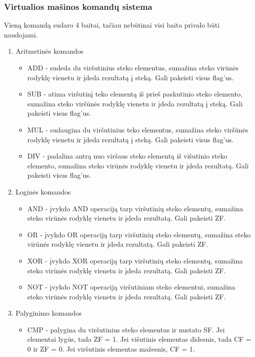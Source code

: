 	\subsubsection{Virtualios mašinos komandų sistema}
	Vieną komandą sudaro 4 baitai, tačiau nebūtinai visi baita privalo būti naudojami.
	\begin{enumerate}
	\item Aritmetinės komandos
		\begin{itemize}
		\item ADD - sudeda du viršutinius steko elementus, sumažina steko virūnės rodyklę vienetu ir įdeda rezultatą į steką. Gali pakeisti visus flag'us.
		\item SUB - atima viršutinį teko elementą iš prieš paskutinio steko elemento, sumažina steko viršūnės rodyklę vienetu ir įdeda rezultatą į steką. Gali pakeisti visus flag'us.
		\item MUL - sudaugina du viršutinius teko elementus, sumažina steko viršūnės rodyklę vienetu ir įdeda rezultatą į steką. Gali pakeisti visus flag'us.
		\item DIV - padalina antrą nuo viršaus steko elementą iš višutinio steko elemento, sumažina steko virūnės rodyklę vienetu ir įdeda rezultatą. Gali pakeisti visus flag'us.
		\end{itemize}
	\item Loginės komandos
		\begin{itemize}
		\item AND - įvykdo AND operaciją tarp viršutinių steko elementų, sumažina steko virūnės rodyklę vienetu ir įdeda rezultatą. Gali pakeisti ZF.
		\item OR - įvykdo OR operaciją tarp viršutinių steko elementų, sumažina steko virūnės rodyklę vienetu ir įdeda rezultatą. Gali pakeisti ZF.
		\item XOR - įvykdo XOR operaciją tarp viršutinių steko elementų, sumažina steko virūnės rodyklę vienetu ir įdeda rezultatą. Gali pakeisti ZF.
		\item NOT - įvykdo NOT operaciją viršutiniam steko elementui, sumažina steko virūnės rodyklę vienetu ir įdeda rezultatą. Gali pakeisti ZF.
		\end{itemize}
	\item Palyginimo komandos
		\begin{itemize}
		\item CMP - palygina du viršutinius steko elementus ir nustato SF. Jei elementai lygūs, tada ZF = 1. Jei višutinis elementas didesnis, tada CF = 0 ir  ZF = 0. Jei viršutinis elementas mažesnis, CF = 1.

\end{itemize}
\end{enumerate}
